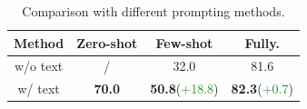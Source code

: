\begin{table}[tb]
\begin{minipage}{0.475\columnwidth}
\centering
\caption{Ablation study on the effect of the text information. }
\centering

  \begin{tabular}{c|ccc}
  \toprule[0.5pt]
  Method & Zero-shot & Few-shot & Fully.\\
  \midrule
  w/o text & / & 32.0 & 81.6   \\
  w/ text & \textbf{70.0} & \textbf{50.8}\scriptsize(\textcolor{ForestGreen}{+18.8}) & \textbf{82.3}\scriptsize(\textcolor{ForestGreen}{+0.7})   \\
  \bottomrule[0.5pt]
  \end{tabular}
\label{tab:text}
\end{minipage}\noindent\hfill
\begin{minipage}{0.475\columnwidth}  
\centering
\caption{Comparison with different prompting methods.}
\label{tab:prompt}
\end{minipage}
\vspace{-0.6cm}
\end{table} 
